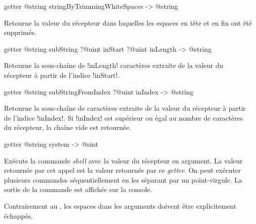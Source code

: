 
\begin{galgas3box}
getter @string stringByTrimmingWhiteSpaces -> @string
\end{galgas3box}

Retourne la valeur du récepteur dans laquelles les espaces en tête et en fin ont été supprimés.





\begin{galgas3box}
getter @string subString ?@uint inStart ?@uint inLength -> @string
\end{galgas3box}

Retourne la sous-chaîne de \ggst!inLength! caractères extraite de la valeur du récepteur à partir de l'indice \ggst!inStart!.







\begin{galgas3box}
getter @string subStringFromIndex ?@uint inIndex -> @string
\end{galgas3box}

Retourne la sous-chaîne de caractères extraite de la valeur du récepteur à partir de l'indice \ggst!inIndex!. Si \ggst!inIndex! est supérieur ou égal au nombre de caractères du récepteur, la chaîne vide est retournée.







\begin{galgas3box}
getter @string system -> @sint
\end{galgas3box}


Exécute la commande \emph{shell} avec la valeur du récepteur en argument. La valeur retournée par cet appel est la valeur retournée par ce \emph{getter}. On peut exécuter plusieurs commandes séquentiellement en les séparant par un point-virgule. La sortie de la commande est affichée sur la console.

Contrairement au , les espaces dans les arguments doivent être explicitement échappés.





